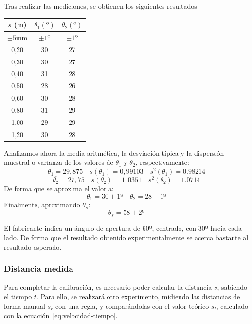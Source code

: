 \documentclass[10pt,a4paper,hidelinks,twocolumn]{article}
\begin{document}
Tras realizar las mediciones, se obtienen los siguientes resultados:
\begin{center}
\begin{tabular}{ | c | c | c | }
\hline
$s$ (m) & $\theta_1(º)$ & $\theta_2(º)$ \\ \hline
$\pm5$mm & $\pm1º$ & $\pm1º$ \\ \hline \hline
0,20 & 30 & 27 \\ \hline
0,30 & 30 & 27 \\ \hline
0,40 & 31 & 28 \\ \hline
0,50 & 28 & 26 \\ \hline
0,60 & 30 & 28 \\ \hline
0,80 & 31 & 29 \\ \hline
1,00 & 29 & 29 \\ \hline
1,20 & 30 & 28 \\ \hline
\end{tabular}
\end{center}

Analizamos ahora la media aritmética, la desviación típica y la dispersión 
muestral o varianza de los valores de $\theta_1$ y $\theta_2$, respectivamente:
$$ \overline{\theta_1} = 29,875 \quad s(\theta_1) = 0,99103 \quad s^2(\theta_1) 
= 0.98214 $$
$$ \overline{\theta_2} = 27,75 \quad s(\theta_2) = 1,0351 \quad s^2(\theta_2) = 
1.0714 $$
De forma que se aproxima el valor a:
$$ \theta_1 = 30 \pm 1º \quad \theta_2 = 28 \pm 1º $$
Finalmente, aproximando $\theta_s$:
$$\theta_s = 58 \pm 2º$$

El fabricante indica un ángulo de apertura de 60º, centrado, con 30º hacia cada 
lado. De forma que el resultado obtenido experimentalmente se acerca bastante al 
resultado esperado.

%
\subsubsection{Distancia medida}

Para completar la calibración, es necesario poder calcular la distancia $s$,
sabiendo el tiempo $t$. Para ello, se realizará otro experimento, midiendo las
distancias de forma manual $s_r$ con una regla, y comparándolas con el valor
teórico $s_t$, calculado con la ecuación~\ref{eq:velocidad-tiempo}.
\end{document}
